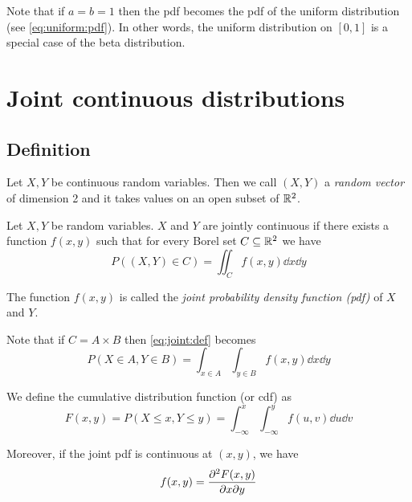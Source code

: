 \documentclass[12pt]{extarticle}
\begin{document}
Note that if $a = b = 1$ then the pdf becomes the pdf of the uniform distribution (see \autoref{eq:uniform:pdf}).
In other words, the uniform distribution on $[0, 1]$ is a special case of the beta distribution.

\section{Joint continuous distributions}

\subsection{Definition}

Let $X, Y$ be continuous random variables.
Then we call $(X, Y)$ a \emph{random vector} of dimension 2 and it takes values on an open subset of $\mathbb{R}^2$.

\begin{definition}
    Let $X, Y$ be random variables. $X$ and $Y$ are jointly continuous if there exists a function $f(x, y)$ such that for every Borel set $C \subseteq \mathbb{R}^2$ we have
    \begin{equation}
        P\left((X,Y) \in C\right) = \iint_C f(x, y) \dd{x} \dd{y} \label{eq:joint:def}
    \end{equation}

    The function $f(x,y)$ is called the \emph{joint probability density function (pdf)} of $X$ and $Y$.
\end{definition}

Note that if $C = A \times B$ then \autoref{eq:joint:def} becomes
\begin{equation}
    P(X \in A, Y \in B) = \int_{x \in A} \int_{y \in B} f(x, y) \dd{x} \dd{y}
\end{equation}

\begin{definition}
    We define the cumulative distribution function (or cdf) as
    \begin{equation}
        F(x, y) = P(X \leq x, Y \leq y) = \int_{-\infty}^x \int_{-\infty}^y f(u, v) \dd{u} \dd{v}
    \end{equation}
\end{definition}

Moreover, if the joint pdf is continuous at $(x, y)$, we have
\begin{equation}
    f(x, y) = \pdv[2]{F(x,y)}{x}{y}
\end{equation}
\end{document}
